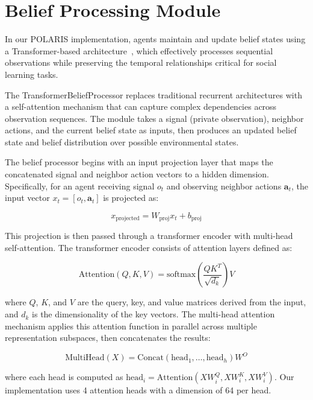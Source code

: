 \documentclass[a4paper,12pt]{report}
\begin{document}
\section{Belief Processing Module}

In our POLARIS implementation, agents maintain and update belief states using a Transformer-based architecture~\cite{vaswani2017attention}, which effectively processes sequential observations while preserving the temporal relationships critical for social learning tasks.

The TransformerBeliefProcessor replaces traditional recurrent architectures with a self-attention mechanism that can capture complex dependencies across observation sequences. The module takes a signal (private observation), neighbor actions, and the current belief state as inputs, then produces an updated belief state and belief distribution over possible environmental states.

The belief processor begins with an input projection layer that maps the concatenated signal and neighbor action vectors to a hidden dimension. Specifically, for an agent receiving signal $o_t$ and observing neighbor actions $\boldsymbol{a}_t$, the input vector $x_t = [o_t, \boldsymbol{a}_t]$ is projected as:

\begin{equation}
    x_{\text{projected}} = W_{\text{proj}}x_t + b_{\text{proj}}
\end{equation}

This projection is then passed through a transformer encoder with multi-head self-attention. The transformer encoder consists of attention layers defined as:

\begin{equation}
    \text{Attention}(Q, K, V) = \text{softmax}\left(\frac{QK^T}{\sqrt{d_k}}\right)V
\end{equation}

where $Q$, $K$, and $V$ are the query, key, and value matrices derived from the input, and $d_k$ is the dimensionality of the key vectors. The multi-head attention mechanism applies this attention function in parallel across multiple representation subspaces, then concatenates the results:

\begin{equation}
    \text{MultiHead}(X) = \text{Concat}(\text{head}_1, \ldots, \text{head}_h)W^O
\end{equation}

where each head is computed as $\text{head}_i = \text{Attention}(XW^Q_i, XW^K_i, XW^V_i)$. Our implementation uses 4 attention heads with a dimension of 64 per head.
\end{document}
